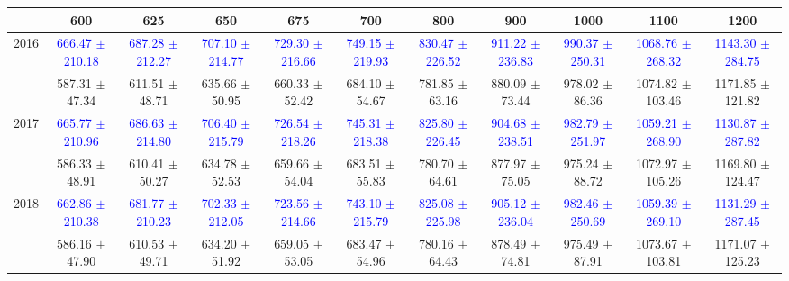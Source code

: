 {
\renewcommand{\arraystretch}{1.0}
\begin{center}
\begin{small}
\begin{tabular}{ccccccccccc}
\hline\hline
 & 600 & 625 & 650 & 675 & 700 & 800 & 900 & 1000 & 1100 & 1200 \\
\hline
\multirow{2}{*}{2016} & \textcolor{blue}{666.47 $\pm$ 210.18} & \textcolor{blue}{687.28 $\pm$ 212.27} & \textcolor{blue}{707.10 $\pm$ 214.77} & \textcolor{blue}{729.30 $\pm$ 216.66} & \textcolor{blue}{749.15 $\pm$ 219.93} & \textcolor{blue}{830.47 $\pm$ 226.52} & \textcolor{blue}{911.22 $\pm$ 236.83} & \textcolor{blue}{990.37 $\pm$ 250.31} & \textcolor{blue}{1068.76 $\pm$ 268.32} & \textcolor{blue}{1143.30 $\pm$ 284.75} \\
 & \textcolor{myred}{587.31 $\pm$ 47.34} & \textcolor{myred}{611.51 $\pm$ 48.71} & \textcolor{myred}{635.66 $\pm$ 50.95} & \textcolor{myred}{660.33 $\pm$ 52.42} & \textcolor{myred}{684.10 $\pm$ 54.67} & \textcolor{myred}{781.85 $\pm$ 63.16} & \textcolor{myred}{880.09 $\pm$ 73.44} & \textcolor{myred}{978.02 $\pm$ 86.36} & \textcolor{myred}{1074.82 $\pm$ 103.46} & \textcolor{myred}{1171.85 $\pm$ 121.82} \\
\hline
\multirow{2}{*}{2017} & \textcolor{blue}{665.77 $\pm$ 210.96} & \textcolor{blue}{686.63 $\pm$ 214.80} & \textcolor{blue}{706.40 $\pm$ 215.79} & \textcolor{blue}{726.54 $\pm$ 218.26} & \textcolor{blue}{745.31 $\pm$ 218.38} & \textcolor{blue}{825.80 $\pm$ 226.45} & \textcolor{blue}{904.68 $\pm$ 238.51} & \textcolor{blue}{982.79 $\pm$ 251.97} & \textcolor{blue}{1059.21 $\pm$ 268.90} & \textcolor{blue}{1130.87 $\pm$ 287.82} \\
 & \textcolor{myred}{586.33 $\pm$ 48.91} & \textcolor{myred}{610.41 $\pm$ 50.27} & \textcolor{myred}{634.78 $\pm$ 52.53} & \textcolor{myred}{659.66 $\pm$ 54.04} & \textcolor{myred}{683.51 $\pm$ 55.83} & \textcolor{myred}{780.70 $\pm$ 64.61} & \textcolor{myred}{877.97 $\pm$ 75.05} & \textcolor{myred}{975.24 $\pm$ 88.72} & \textcolor{myred}{1072.97 $\pm$ 105.26} & \textcolor{myred}{1169.80 $\pm$ 124.47} \\
\hline
\multirow{2}{*}{2018} & \textcolor{blue}{662.86 $\pm$ 210.38} & \textcolor{blue}{681.77 $\pm$ 210.23} & \textcolor{blue}{702.33 $\pm$ 212.05} & \textcolor{blue}{723.56 $\pm$ 214.66} & \textcolor{blue}{743.10 $\pm$ 215.79} & \textcolor{blue}{825.08 $\pm$ 225.98} & \textcolor{blue}{905.12 $\pm$ 236.04} & \textcolor{blue}{982.46 $\pm$ 250.69} & \textcolor{blue}{1059.39 $\pm$ 269.10} & \textcolor{blue}{1131.29 $\pm$ 287.45} \\
 & \textcolor{myred}{586.16 $\pm$ 47.90} & \textcolor{myred}{610.53 $\pm$ 49.71} & \textcolor{myred}{634.20 $\pm$ 51.92} & \textcolor{myred}{659.05 $\pm$ 53.05} & \textcolor{myred}{683.47 $\pm$ 54.96} & \textcolor{myred}{780.16 $\pm$ 64.43} & \textcolor{myred}{878.49 $\pm$ 74.81} & \textcolor{myred}{975.49 $\pm$ 87.91} & \textcolor{myred}{1073.67 $\pm$ 103.81} & \textcolor{myred}{1171.07 $\pm$ 125.23} \\
\hline\hline
\end{tabular}
\end{small}
\end{center}
}

